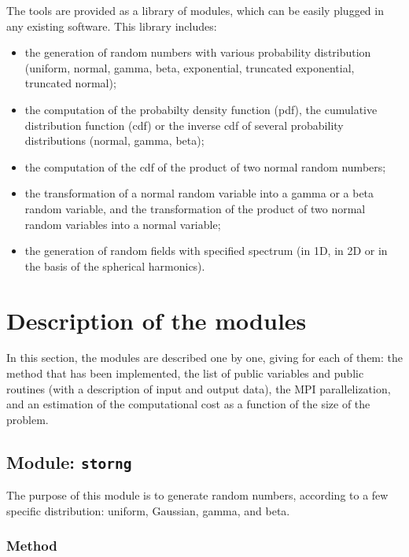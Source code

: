 \documentclass[11pt]{article}
\begin{document}
The tools are provided as a library of modules,
which can be easily plugged in any existing software.
This library includes:

\begin{itemize}
\item the generation of random numbers with various probability distribution
      (uniform, normal, gamma, beta, exponential, truncated exponential, truncated normal);
\item the computation of the probabilty density function (pdf), the cumulative distribution function (cdf)
      or the inverse cdf of several probability distributions (normal, gamma, beta);
\item the computation of the cdf of the product of two normal random numbers;
\item the transformation of a normal random variable into a gamma or a beta random variable,
      and the transformation of the product of two normal random variables into a normal variable;
\item the generation of random fields with specified spectrum (in 1D, in 2D or
      in the basis of the spherical harmonics).
\end{itemize}

\clearpage

\pagestyle{plain}

\section{Description of the modules}

In this section,
the modules are described one by one,
giving for each of them:
the method that has been implemented,
the list of public variables and public routines
(with a description of input and output data),
the MPI parallelization, and
an estimation of the computational cost
as a function of the size of the problem.

\subsection{Module: {\tt\bf storng}}

The purpose of this module is to generate random numbers,
according to a few specific distribution:
uniform, Gaussian, gamma, and beta.

\subsubsection*{Method}
\end{document}
